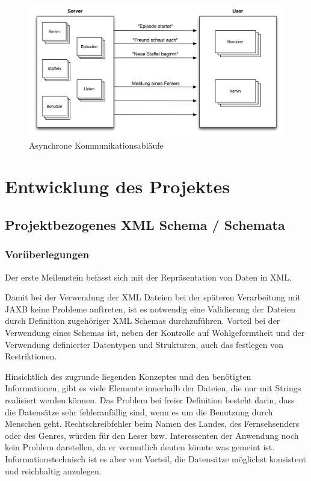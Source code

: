 \documentclass[a4paper]{article}
\begin{document}
\begin{figure}[H]
\includegraphics[width=1\textwidth]{images/kommunikationsablaeufeAsynchron.png}
\caption{Asynchrone Kommunikationsabläufe}
\label{kommunikationsablaeufeAsynchron}
\end{figure}


\newpage

\section{Entwicklung des Projektes}

\subsection{Projektbezogenes XML Schema / Schemata}
\subsubsection{Vorüberlegungen}
Der erste Meilenstein befasst sich mit der Repräsentation von Daten in XML.

Damit bei der Verwendung der XML Dateien bei der späteren Verarbeitung mit JAXB keine Probleme auftreten,
ist es notwendig eine Validierung der Dateien durch Definition zugehöriger XML Schemas durchzuführen.
Vorteil bei der Verwendung eines Schemas ist, neben der Kontrolle auf Wohlgeformtheit und der Verwendung
definierter Datentypen und Strukturen, auch das festlegen von Restriktionen.

Hinsichtlich des zugrunde liegenden Konzeptes und den benötigten Informationen, gibt es viele Elemente
innerhalb der Dateien, die nur mit Strings realisiert werden können. Das Problem bei freier Definition
besteht darin, dass die Datensätze sehr fehleranfällig sind, wenn es um die Benutzung durch Menschen geht.
Rechtschreibfehler beim Namen des Landes, des Fernsehsenders oder des Genres, würden für den Leser bzw.
Interessenten der Anwendung noch kein Problem darstellen, da er vermutlich deuten könnte was gemeint ist.
Informationstechnisch ist es aber von Vorteil, die Datensätze möglichst konsistent und reichhaltig anzulegen.
\end{document}
